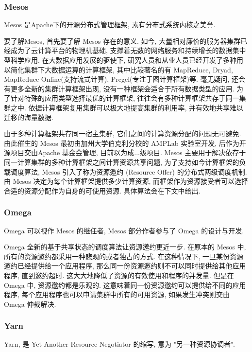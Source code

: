 \documentclass[UTF8,a4paper]{ctexart}
\begin{document}
\subsubsection{Mesos}
Mesos\cite{Mesos2011} 是Apache下的开源分布式管理框架, 素有分布式系统内核之美誉.

要了解Mesos, 首先要了解 Mesos 存在的意义. 如今, 大量相对廉价的服务器集群已经成为了云计算平台的物理机基础, 支撑着无数的网络服务和持续增长的数据集中型科学应用. 在大数据应用发展的驱使下, 研究人员和从业人员已经开发了多种用以简化集群下大数据运算的计算框架, 其中比较著名的有 MapReduce\cite{MapReduce2004}, Dryad\cite{Quincy2009}, MapReduce Online\cite{MROline2010}(支持流式计算), Pregel\cite{Pregel2010}(专注于图计算框架)等. 毫无疑问, 还会有更多全新的集群计算框架出现, 没有一种框架会适合于所有数据类型的应用. 为了针对特殊的应用类型选择最优的计算框架, 往往会有多种计算框架共存于同一集群之中. 依据计算框架复用集群可以极大地提高集群的利用率, 并有效地共享难以迁移的海量数据.

由于多种计算框架共存同一宿主集群, 它们之间的计算资源分配的问题无可避免. 由此催生的 Mesos 最初由加州大学伯克利分校的 AMPLab 实验室开发, 后作为开源项目交由Apache 基金会管理, 目前以为成...级项目. Mesos 主要用于解决依存于同一计算集群的多种计算框架之间计算资源共享问题, 为了支持如今计算框架的负载调度算法, Mesos 引入了称为资源邀约 (Resource Offer) 的分布式两级调度机制. 由 Mesos 决定为每个计算框架提供多少计算资源, 而框架作为资源接受者可以选择合适的资源分配作为自身的可使用资源. 具体算法会在下文中给出.

\subsubsection{Omega}
Omega\cite{Omega2013} 可以视作 Mesos 的继任者, Mesos 部分作者参与了 Omega 的设计与开发.

Omega 全新的基于共享状态的调度算法让资源邀约更近一步. 在原本的 Mesos 中, 所有的资源邀约都采用一种悲观的或者独占的方式. 在这种情况下, 一旦某份资源邀约已经提供给一个应用程序, 那么同一份资源邀约则不可以同时提供给其他应用程序, 直到邀约超时. 这大大地降低了资源的有效使用和程序的并发量. 但是在 Omega 中, 资源邀约都是乐观的. 这意味着同一份资源邀约可以提供给不同的应用程序, 每个应用程序也可以申请集群中所有的可用资源, 如果发生冲突则交由 Omega 仲裁解决.

\subsubsection{Yarn}
Yarn\cite{Yarn2013}, 是 Yet Another Resource Negotiator 的缩写, 意为 "另一种资源协调者".
\end{document}
